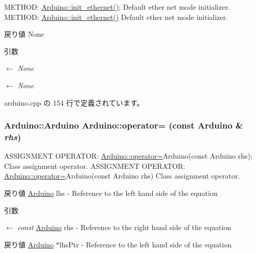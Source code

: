 METHOD: \hyperlink{classArduino_a1839d0c9bcb7c8b7f3fef2d8ac9eaad0_a1839d0c9bcb7c8b7f3fef2d8ac9eaad0}{Arduino::init\_\-ethernet()}; Default ether net mode initializer. METHOD: \hyperlink{classArduino_a1839d0c9bcb7c8b7f3fef2d8ac9eaad0_a1839d0c9bcb7c8b7f3fef2d8ac9eaad0}{Arduino::init\_\-ethernet()} Default ether net mode initializer.

\begin{DoxyReturn}{戻り値}
None 
\end{DoxyReturn}

\begin{DoxyParams}{引数}
\item[\mbox{$\leftarrow$} {\em None}]\item[\mbox{$\leftarrow$} {\em None}]\end{DoxyParams}


 arduino.cpp の 154 行で定義されています。\hypertarget{classArduino_af5f8c01c5fdf577706d231b56e060951_af5f8c01c5fdf577706d231b56e060951}{
\subsubsection[{operator=}]{\setlength{\rightskip}{0pt plus 5cm}Arduino::Arduino Arduino::operator= (const {\bf Arduino} \& {\em rhs})}}
\label{classArduino_af5f8c01c5fdf577706d231b56e060951_af5f8c01c5fdf577706d231b56e060951}


ASSIGNMENT OPERATOR: \hyperlink{classArduino_af5f8c01c5fdf577706d231b56e060951_af5f8c01c5fdf577706d231b56e060951}{Arduino::operator=}Arduino(const Arduino rhs); Class assignment operator. ASSIGNMENT OPERATOR: \hyperlink{classArduino_af5f8c01c5fdf577706d231b56e060951_af5f8c01c5fdf577706d231b56e060951}{Arduino::operator=}Arduino(const Arduino rhs) Class assignment operator.

\begin{DoxyReturn}{戻り値}
\hyperlink{classArduino}{Arduino} lhs -\/ Reference to the left hand side of the equation 
\end{DoxyReturn}

\begin{DoxyParams}{引数}
\item[\mbox{$\leftarrow$} {\em const}]\hyperlink{classArduino}{Arduino} rhs -\/ Reference to the right hand side of the equation\end{DoxyParams}
\begin{DoxyReturn}{戻り値}
\hyperlink{classArduino}{Arduino} $\ast$lhsPtr -\/ Reference to the left hand side of the equation 
\end{DoxyReturn}

